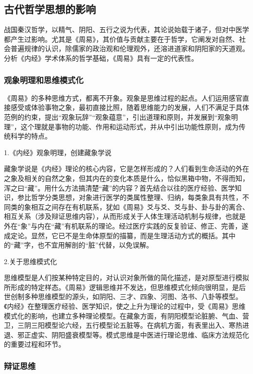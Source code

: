 \documentclass[draft,12pt]{ctexbook}
\begin{document}
\subsection{古代哲学思想的影响} %

战国秦汉哲学，以精气、阴阳、五行之说为代表，其论说始载于诸子，但对中医学都产生过影响。尤其是《周易》，其价值与贡献主要在于哲学，它阐发对自然、社会普遍规律的认识，除儒家的政治观和伦理观外，还溶进道家和阴阳家的天道观。分析《内经》学术体系的哲学基础，《周易》具有一定的代表性。

\subsubsection{观象明理和思维模式化}%

《周易》的多种思维方式，都离不开象。观象是思维过程的起点。人们运用感官直接感受或体验事物之象，最初直接比照，随着思维能力的发展，人们不满足于具体范例的约束，提出“观象玩辞”“观象蕴意”，引出道理和原则，并发展到“观象明理”，这个理就是事物的功能、作用和运动形式，并从中引出功能性原则，成为传统科学的特点。

1.《内经》观象明理，创建藏象学说

藏象学说是《内经》理论的核心内容，它是怎样形成的？人们看到生命活动的外在之象及相关的自然之象，但其内在的变化本质是什么，恰似黑箱中物，不得而知，浑之曰“藏”。用什么方法搞清楚“藏”的内容？首先结合以往的医疗经验、医学知识，参比哲学分类思想，对象进行医学的类属性整理、归纳，每类象具有共性，不同类的象相互之间存在有机联系，犹如《周易》爻与爻、爻与卦、卦与卦的离合、相互关系（涉及辩证思维内容），从而形成关于人体生理活动机制与规律，也就是外在“象”与内在“藏”有机联系的理论。经过医疗实践的反复验证、修正、完善，遂成定论。显然，它已不是生命体原型的描纂，而是生理活动方式的概括。其中的“藏”字，也不宜用解剖的“脏”代替，以免误解。

2.关于思维模式化

思维模型是人们按某种特定目的，对认识对象所做的简化描述，是对原型进行模拟所形成的特定样态。《周易》逻辑思维并不发达，但思维模式化倾向很明显，是后世创制多种思维模型的源头，如阴阳、三才、四象、河图、洛书、八卦等模型。《内经》在整理医疗经验、医学知识，使之上升为理论的过程中，受《周易》思维模式化的影响，也建立多种理论模型。在藏象方面，有阴阳模型论脏腑、气血、营卫，三阴三阳模型论六经，五行模型论五脏等。在病机方面，有表里出入、寒热进退、邪正虚实、阴阳盛衰模型等。模式思维是中医进行理论思维、临床方法规范化的重要过程和环节。

\subsubsection{辩证思维}%
\end{document}
